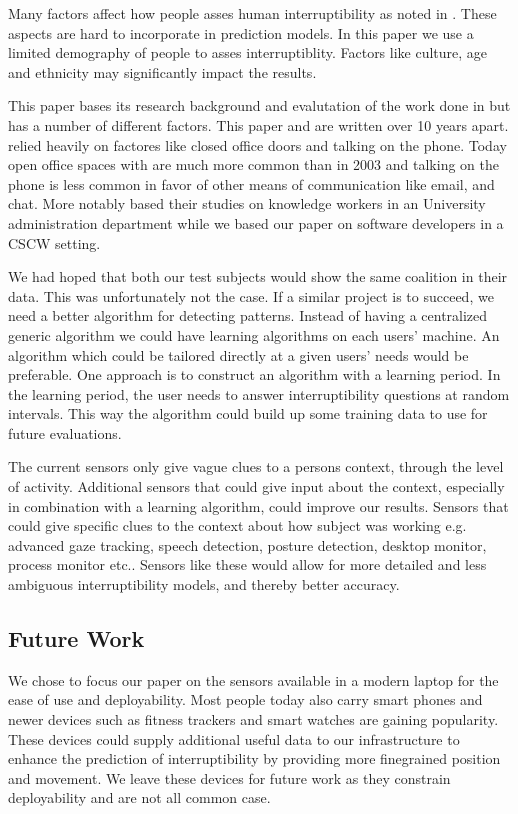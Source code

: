 \documentclass{sigchi}
\begin{document}
Many factors affect how people asses human interruptibility as noted in \cite{Avrahami2007}.
These aspects are hard to incorporate in prediction models.
In this paper we use a limited demography of people to asses interruptiblity.
Factors like culture, age and ethnicity may significantly impact the results.

This paper bases its research background and evalutation of the work done in \cite{fogarty2005predicting} but has a number of different factors. This paper and \cite{fogarty2005predicting} are written over 10 years apart. \cite{fogarty2005predicting} relied heavily on factores like closed office doors and talking on the phone. Today open office spaces with are much more common than in 2003 and talking on the phone is less common in favor of other means of communication like email, and chat. More notably \cite{fogarty2005predicting} based their studies on knowledge workers in an University administration department while we based our paper on software developers in a CSCW setting.

We had hoped that both our test subjects would show the same coalition in their data.
This was unfortunately not the case.
If a similar project is to succeed, we need a better algorithm for detecting patterns.
Instead of having a centralized generic algorithm we could have learning algorithms on each users’ machine.
An algorithm which could be tailored directly at a given users’ needs would be preferable.
One approach is to construct an algorithm with a learning period.
In the learning period, the user needs to answer interruptibility questions at random intervals.
This way the algorithm could build up some training data to use for future evaluations.

The current sensors only give vague clues to a persons context, through the level of activity.
Additional sensors that could give input about the context, especially in combination with a learning algorithm, could improve our results. 
Sensors that could give specific clues to the context about how subject was working e.g. advanced gaze tracking, speech detection, posture detection, desktop monitor, process monitor etc..
Sensors like these would allow for more detailed and less ambiguous interruptibility models, and thereby better accuracy.


\subsection{Future Work}
We chose to focus our paper on the sensors available in a modern laptop for the ease of use and deployability.
Most people today also carry smart phones and newer devices such as fitness trackers and smart watches are gaining popularity.
These devices could supply additional useful data to our infrastructure to enhance the prediction of interruptibility by providing more finegrained position and movement.
We leave these devices for future work as they constrain deployability and are not all common case.
\end{document}
